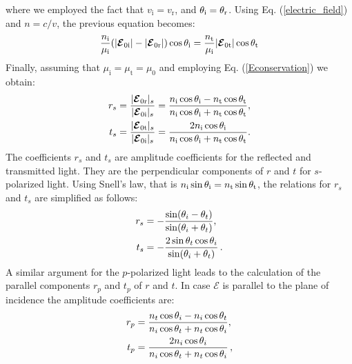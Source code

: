 where we employed the fact that $v_{\textrm{i}}= v_{\textrm{r}}$, and $\theta_{\textrm{i}}= \theta_{\textrm{r}}$. 
Using Eq. (\ref{electric_field}) and $n = c/v$, the previous equation becomes:
\begin{equation}
\frac{n_{\textrm{i}}}{\mu_{\textrm{i}}}(|\boldsymbol{\mathcal{E}}_{0\textrm{i}}|-|\boldsymbol{\mathcal{E}}_{0\textrm{r}}|)\cos\theta_{\textrm{i}} = \frac{n_{\textrm{t}}}{\mu_{\textrm{i}}}|\boldsymbol{\mathcal{E}}_{0\textrm{t}}|\cos\theta_{\textrm{t}}
\end{equation}
Finally,  assuming that $\mu_{\textrm{i}}=\mu_{\textrm{t}}=\mu_{0}$ and employing Eq. (\ref{Econservation}) we obtain:
\begin{equation} \label{Fresnel_perpendicular}
\begin{split}
r_{s} & =\frac{|\boldsymbol{\mathcal{E}}_{0 \textrm{r}}|_{s}}{|\boldsymbol{\mathcal{E}}_{0\textrm{i}}|_s} = 
\frac{n_\textrm{i}\cos\theta_\textrm{i}-n_\textrm{t} \cos\theta_\textrm{t}}{n_\textrm{i}
\cos\theta_\textrm{i}+n_\textrm{t}\cos\theta_\textrm{t}},\\
t_{s} & = \frac{|\boldsymbol{\mathcal{E}}_{0 \textrm{t}}|_s}{|\boldsymbol{\mathcal{E}}_{0\textrm{i}}|_s} 
=\frac{2n_\textrm{i}\cos\theta_\textrm{i}}{n_\textrm{i}\cos\theta_\textrm{i}+n_\textrm{t}\cos\theta_\textrm{t}}.\\
\end{split}
\end{equation}
The coefficients $r_s$ and $t_s$ are amplitude coefficients for the reflected and transmitted light.
They are the perpendicular components of $r$ and $t$ for $s$-polarized light.
Using Snell's law, that is $n_{\textrm{i}}\sin\theta_{\textrm{i}} = n_{\textrm{t}}\sin\theta_{\textrm{t}}$, the relations for $r_s$ and $t_s$ are simplified as follows:
\begin{equation} \label{simple_Fresnel}
\begin{split}
r_{s} & = -\frac{\sin(\theta_i-\theta_t)}{\sin(\theta_i+\theta_t)},\\
t_{s} & = -\frac{2\sin \theta_t \cos \theta_i}{\sin(\theta_i+\theta_t)}\,.
\end{split}
\end{equation}
\indent A similar argument for the $p$-polarized light leads to the calculation of the parallel components $r_p$ and $t_p$ of $r$ and $t$. 
In case $\boldsymbol{\mathcal{E}}$ is parallel to the plane of incidence the amplitude coefficients are:
\begin{equation}\label{Fresnel_parallel}
\begin{split}
r_{p} & = \frac{n_t\cos\theta_i-n_i \cos\theta_t}{n_i \cos\theta_t+n_t\cos\theta_i},\\
t_{p} & =  \frac{2n_i\cos\theta_i}{n_i\cos\theta_t+n_t\cos\theta_i}\,,
\end{split}
\end{equation}
